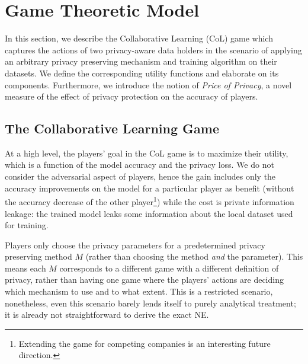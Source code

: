 \documentclass[USenglish,oneside,twocolumn]{article}
\theoremstyle{plain}
\begin{document}
    \vspace{-0.5cm}
    \section{Game Theoretic Model}
    \label{sec:game}
    \vspace{-0.25cm}
    
    In this section, we describe the Collaborative Learning (CoL) game which captures the actions of two privacy-aware data holders in the scenario of applying an arbitrary privacy preserving mechanism and training algorithm on their datasets. We define the corresponding utility functions and elaborate on its components. Furthermore, we introduce the notion of \textit{Price of Privacy}, a novel measure of the effect of privacy protection on the accuracy of players.
    
    \vspace{-0.5cm}
    \subsection{The Collaborative Learning Game}
    \vspace{-0.25cm}
    
    At a high level, the players' goal in the CoL game is to maximize their utility, which is a function of the model accuracy and the privacy loss. We do not consider the adversarial aspect of players, hence the gain includes only the accuracy improvements on the model for a particular player as benefit (without the accuracy decrease of the other player\footnote{Extending the game for competing companies is an interesting future direction.}) while the cost is private information leakage: the trained model leaks some information about the local dataset used for training. 
    
    Players only choose the privacy parameters for a predetermined privacy preserving method $M$ (rather than choosing the method \textit{and} the parameter). This means each $M$ corresponds to a different game with a different definition of privacy, rather than having one game where the players' actions are deciding which mechanism to use and to what extent. This is a restricted scenario, nonetheless, even this scenario barely lends itself to purely analytical treatment; it is already not straightforward to derive the exact NE. 
    
\end{document}
